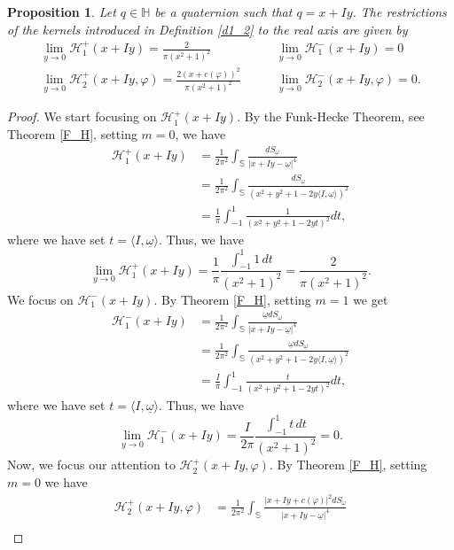 \documentclass[reqno,11pt]{amsart}
\numberwithin{equation}{section}
\newtheorem{proposition}[theorem]{Proposition}
\theoremstyle{definition}
\begin{document}
\begin{proposition}\label{p1_2} Let $q\in\mathbb H$ be a quaternion such that $q=x+Iy$. The restrictions of the kernels introduced in Definition \ref{d1_2} to the real axis are given by
	\begin{align*}
		\lim_{y\to 0}\mathcal H^{+}_1 (x+Iy)=   \frac{2}{\pi(x^2+1)^2} & \quad\quad
		\lim_{y\to 0}\mathcal H^{-}_1 (x+Iy)= 0\\
		\lim_{y\to 0}\mathcal H^{+}_2 (x+Iy,\varphi)= \frac{2 (x+c(\varphi))^2}{\pi(x^2+1)^2} &\quad\quad
		\lim_{y\to 0}\mathcal H^{-}_2 (x+Iy,\varphi)=0.
	\end{align*}
\end{proposition}
\begin{proof}
We start focusing on $\mathcal H^{+}_{1}(x+Iy)$. By the Funk-Hecke Theorem, see Theorem \ref{F_H}, setting $m=0$, we have
	\begin{align*}
		\mathcal H^+_1(x+Iy)&= \frac{1}{2 \pi^2}\int_{\mathbb S} \frac{dS_{\underline{\omega}}}{|x+Iy-\underline{\omega}|^4}\\
		&=\frac{1}{2 \pi^2}\int_{\mathbb S} \frac{dS_{\underline{\omega}}}{\left(x^2+y^2+1-2y\langle I,\underline{\omega} \rangle\right)^2}\\
		&= \frac{1}{\pi} \int_{-1}^1 \frac{1}{\left( x^2+y^2+1-2yt\right)^2} dt,
	\end{align*}
where we have set $t=\langle I,\underline{\omega} \rangle$. Thus, we have
	$$\lim_{y\to 0}\mathcal H^{+}_1 (x+Iy)=  \frac{1}{\pi} \frac{\int_{-1}^1 1\, dt}{(x^2+1)^2}=  \frac{2}{\pi(x^2+1)^2}. $$
We focus on $\mathcal{H}^-_1(x+Iy)$. By Theorem \ref{F_H}, setting $m=1$ we get
	\begin{align*}
		\mathcal H^-_1(x+Iy)&= \frac{1}{2 \pi^2}\int_{\mathbb S} \frac{\underline{\omega} dS_{\underline{\omega}}}{|x+Iy-\underline{\omega}|^4}\\
		&=\frac{1}{2 \pi^2}\int_{\mathbb S} \frac{\underline{\omega} dS_{\underline{\omega}}}{\left(x^2+y^2+1-2y\langle I,\underline{\omega} \rangle\right)^2}\\
		&=\frac{I}{\pi} \int_{-1}^1 \frac{t}{\left( x^2+y^2+1-2yt\right)^2} dt,
	\end{align*}
where we have set $t=\langle I,\underline{\omega} \rangle$. Thus, we have
	$$ \lim_{y\to 0}\mathcal H^{-}_1 (x+Iy)=   \frac{I }{2 \pi} \frac{\int_{-1}^1  t\, dt}{(x^2+1)^2}=0. $$
	Now, we focus our attention to $\mathcal H^{+}_{2}(x+Iy, \varphi)$. By Theorem \ref{F_H}, setting $m=0$ we have
	\begin{align*}
		\mathcal H^+_2(x+Iy,\varphi)&= \frac{1}{2 \pi^2}\int_{\mathbb S} \frac{|x+Iy+c(\varphi)|^2 dS_{\underline{\omega}}}{|x+Iy-\underline{\omega}|^4}\\

\end{align*}
\end{proof}
\end{document}
